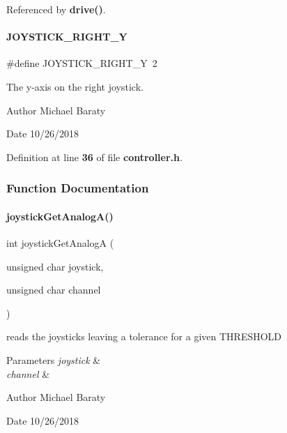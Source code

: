 Referenced by \textbf{ drive()}.

\mbox{\label{controller_8h_aaf742c9662e00d519092071167eb8c7a}} 
\paragraph{J\+O\+Y\+S\+T\+I\+C\+K\+\_\+\+R\+I\+G\+H\+T\+\_\+Y}
{\footnotesize\ttfamily \#define J\+O\+Y\+S\+T\+I\+C\+K\+\_\+\+R\+I\+G\+H\+T\+\_\+Y~2}



The y-\/axis on the right joystick. 

\begin{DoxyAuthor}{Author}
Michael Baraty 
\end{DoxyAuthor}
\begin{DoxyDate}{Date}
10/26/2018 
\end{DoxyDate}


Definition at line \textbf{ 36} of file \textbf{ controller.\+h}.



\subsubsection{Function Documentation}
\mbox{\label{controller_8h_a03560084f97816fe3f0d05f788f03f06}} 
\paragraph{joystick\+Get\+Analog\+A()}
{\footnotesize\ttfamily int joystick\+Get\+AnalogA (\begin{DoxyParamCaption}\item[{unsigned char}]{joystick,  }\item[{unsigned char}]{channel }\end{DoxyParamCaption})}



reads the joysticks leaving a tolerance for a given T\+H\+R\+E\+S\+H\+O\+LD 


\begin{DoxyParams}{Parameters}
{\em joystick} & \\
\hline
{\em channel} & \\
\hline
\end{DoxyParams}
\begin{DoxyAuthor}{Author}
Michael Baraty 
\end{DoxyAuthor}
\begin{DoxyDate}{Date}
10/26/2018 
\end{DoxyDate}


